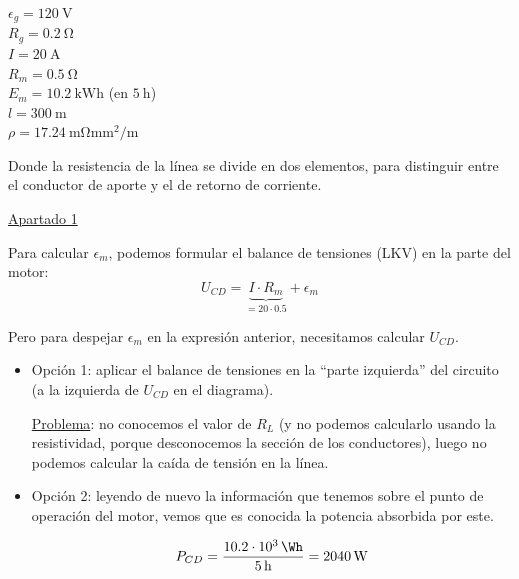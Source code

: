 \begin{example}
\begin{minipage}{0.3\linewidth}
            $\epsilon_g = \qty{120}{\volt}$\\
            $R_g = \qty{0.2}{\ohm}$\\
            $I = \qty{20}{\ampere}$\\
            $R_m = \qty{0.5}{\ohm}$\\
            $E_m = \qty{10.2}{\kWh}$ (en $\qty{5}{\hour}$)\\
            $l = \qty{300}{\meter}$\\
            $\rho =
            \qty{17.24}{\milli\ohm\milli\meter\squared\per\meter}$
          \end{minipage}

          \vspace{6mm}

          Donde la resistencia de la línea se divide en dos elementos,
          para distinguir entre el conductor de aporte y el de retorno
          de corriente.

          \vspace{6mm}

          \underline{Apartado 1}

          \vspace{4mm}

          Para calcular $\epsilon_m$, podemos formular el balance de
          tensiones (LKV) en la parte del motor:
          \[
            U_{CD} = \underbrace{I \cdot R_m}_{= 20 \cdot 0.5} +
            \epsilon_m
          \]

          Pero para despejar $\epsilon_m$ en la expresión anterior,
          necesitamos calcular $U_{CD}$.
          \begin{itemize}
          \item Opción 1: aplicar el balance de tensiones en la
            ``parte izquierda'' del circuito (a la izquierda de
            $U_{CD}$ en el diagrama).
    
            \underline{Problema}: no conocemos el valor de $R_L$ (y no
            podemos calcularlo usando la resistividad, porque
            desconocemos la sección de los conductores), luego no
            podemos calcular la caída de tensión en la línea.
    
          \item Opción 2: leyendo de nuevo la información que tenemos
            sobre el punto de operación del motor, vemos que es
            conocida la potencia absorbida por este.

    \[
      P_{CD} = \frac{10.2 \cdot 10^{3} \, \si{\Wh}}{\qty{5}{\hour}} =
      \qty{2040}{\watt}
    \]


\end{itemize}
\end{example}
